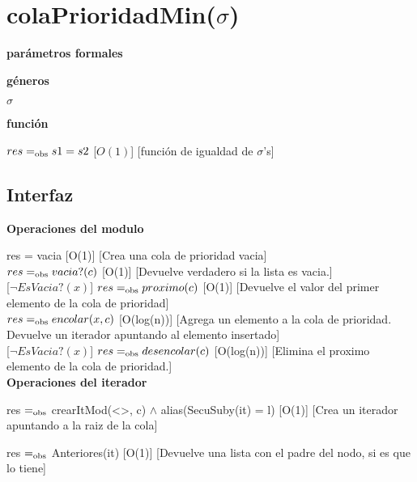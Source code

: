 \section{colaPrioridadMin($\sigma$)}

\textbf{parámetros formales}\parindent\\
\parbox{1.7cm}{\textbf{géneros}}  $\sigma$\\
\parbox[t]{1.7cm}{\textbf{función}}\parbox[t]{\textwidth-2\parindent-1.7cm}{%
{$res =_{\mathrm{obs}} s1 = s2$}
[$O(1)$]
[función de igualdad de $\sigma$'s]
}

\subsection{Interfaz}

\bf{Operaciones del modulo}

{res = vacia}
[O(1)]
[Crea una cola de prioridad vacia]\\

{$res =_{\mathrm{obs}} vacia?(c)$}
[O(1)]
[Devuelve verdadero si la lista es vacia.]\\

[$\neg EsVacia?(x)$]
{$res =_{\mathrm{obs}} proximo(c)$}
[O(1)]
[Devuelve el valor del primer elemento de la cola de prioridad]\\

{$res =_{\mathrm{obs}} encolar(x,c)$}
[O(log(n))]
[Agrega un elemento a la cola de prioridad. Devuelve un iterador apuntando al elemento insertado]\\

[$\neg EsVacia?(x)$]
{$res =_{\mathrm{obs}} desencolar(c)$}
[O(log(n))]
[Elimina el proximo elemento de la cola de prioridad.]\\

\bf{Operaciones del iterador}

{res $=_{\mathrm{obs}}$ crearItMod(<>, c) $\wedge$ alias(SecuSuby(it) = l)}
[O(1)]
[Crea un iterador apuntando a la raiz de la cola]

{res $=_{\mathrm{obs}}$ Anteriores(it)}
[O(1)]
[Devuelve una lista con el padre del nodo, si es que lo tiene]

